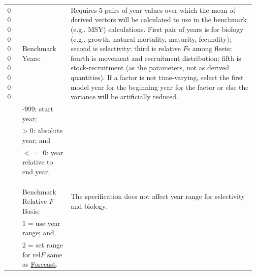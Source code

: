 \begin{landscape}
{\begin{longtable}{p{2cm} p{7cm} p{12cm}}
  \hline
  \multirow{1}{1cm}[-0.15cm]{\parbox{2cm}{0 0 0 0 0 0 0 0 0 0}} & Benchmark Years: & \multirow{1}{1cm}[-0.15cm]{\parbox{12cm}{Requires 5 pairs of year values over which the mean of derived vectors will be calculated to use in the benchmark (e.g., MSY) calculations. First pair of years is for biology (e.g., growth, natural mortality, maturity, fecundity); second is selectivity; third is relative $F$s among fleets; fourth is movement and recruitment distribution; fifth is stock-recruitment (as the parameters, not as derived quantities). If a factor is not time-varying, select the first model year for the beginning year for the factor or else the variance will be artificially reduced.}} \Tstrut\\
    & -999: start year; & \\
    & > 0: absolute year; and & \\
    & $<=$ 0: year relative to end year. & \Bstrut\\
    & & \\
    & & \\
    & & \\

  \pagebreak
  \hline
  1 & Benchmark Relative $F$ Basis: & \multirow{1}{1cm}[-0.2cm]{\parbox{12cm}{The specification does not affect year range for selectivity and biology.}} \Tstrut\\
    & 1 = use year range; and & \\
    & 2 = set range for $\text{rel}F$ same as \hyperlink{Fcast}{Forecast}. & \Bstrut\\


\end{longtable}}
\end{landscape}
